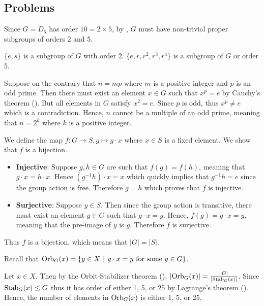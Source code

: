 \subsection*{Problems}
\begin{questions}
    \item \begin{partquestions}{\roman*}
        \item Since $G = D_5$ has order $10 = 2 \times 5$, by , $G$ must have non-trivial proper subgroups of orders 2 and 5.
        \item $\{e, s\}$ is a subgroup of $G$ with order 2. $\{e, r, r^2, r^3, r^4\}$ is a subgroup of $G$ or order 5.
    \end{partquestions}

    \item Suppose on the contrary that $n = mp$ where $m$ is a positive integer and $p$ is an odd prime. Then there must exist an element $x \in G$ such that $x^p = e$ by Cauchy's theorem (). But all elements in $G$ satisfy $x^2 = e$. Since $p$ is odd, thus $x^p \neq e$ which is a contradiction. Hence, $n$ cannot be a multiple of an odd prime, meaning that $n = 2^k$ where $k$ is a positive integer.

    \item We define the map $f: G \to S, g \mapsto g \cdot x$ where $x \in S$ is a fixed element. We show that $f$ is a bijection.
    \begin{itemize}
        \item \textbf{Injective}: Suppose $g, h \in G$ are such that $f(g) = f(h)$, meaning that $g\cdot x = h\cdot x$. Hence $(g^{-1}h) \cdot x = x$ which quickly implies that $g^{-1}h = e$ since the group action is free. Therefore $g = h$ which proves that $f$ is injective.
        \item \textbf{Surjective}: Suppose $y \in S$. Then since the group action is transitive, there must exist an element $g \in G$ such that $g \cdot x = y$. Hence, $f(g) = g\cdot x = y$, meaning that the pre-image of $y$ is $g$. Therefore $f$ is surjective.
    \end{itemize}
    Thus $f$ is a bijection, which means that $|G| = |S|$.

    \item Recall that $\Orb{G}{x} = \{y \in X \vert g\cdot x = y \text{ for some } g \in G\}$.

    Let $x \in X$. Then by the Orbit-Stabilizer theorem (), $|\mathrm{Orb}_{G}(x)| = \frac{|G|}{|\mathrm{Stab}_{G}(x)|}$. Since $\mathrm{Stab}_{G}(x) \leq G$ thus it has order of either 1, 5, or 25 by Lagrange's theorem (). Hence, the number of elements in $\mathrm{Orb}_{G}(x)$ is either 1, 5, or 25.


\end{questions}
